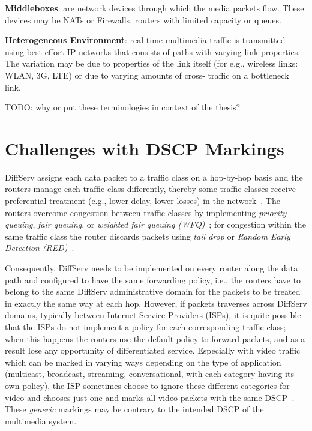 \textbf{Middleboxes}: are network devices through which the media packets
flow. These devices may be NATs or Firewalls, routers with limited capacity or
queues.

\textbf{Heterogeneous Environment}: real-time multimedia traffic is
transmitted using best-effort IP networks that consists of paths with varying
link properties. The variation may be due to properties of the link itself
(for e.g., wireless links: WLAN, 3G, LTE) or due to varying amounts of cross-
traffic on a bottleneck link.

 {\color{red} TODO: why or put these terminologies in context of the thesis?}


\section{Challenges with DSCP Markings}
\label{rg.ch.dscp}

DiffServ assigns each data packet to a traffic class on a hop-by-hop basis and
the routers manage each traffic class differently, thereby some traffic
classes receive preferential treatment (e.g., lower delay, lower losses) in
the network~\cite{rfc2475}. The routers overcome congestion between traffic
classes by implementing \emph{priority queuing}, \emph{fair queuing}, or
\emph{weighted fair queuing (WFQ)}~\cite{rfc4594}; for congestion within the
same traffic class the router discards packets using \emph{tail drop} or
\emph{Random Early Detection (RED)}~\cite{Floyd:RED}.

Consequently, DiffServ needs to be implemented on every router along the data
path and configured to have the same forwarding policy, i.e., the routers have
to belong to the same DiffServ administrative domain for the packets to be
treated in exactly the same way at each hop. However, if packets traverses
across DiffServ domains, typically between Internet Service Providers (ISPs),
it is quite possible that the ISPs do not implement a policy for each
corresponding traffic class; when this happens the routers use the default
policy to forward packets, and as a result lose any opportunity of
differentiated service. Especially with video traffic which can be marked in
varying ways depending on the type of application (multicast, broadcast,
streaming, conversational, with each category having its own policy), the ISP
sometimes choose to ignore these different categories for video and chooses
just one and marks all video packets with the same DSCP~\cite{rfc5865}. These
\emph{generic} markings may be contrary to the intended DSCP of the multimedia
system.

